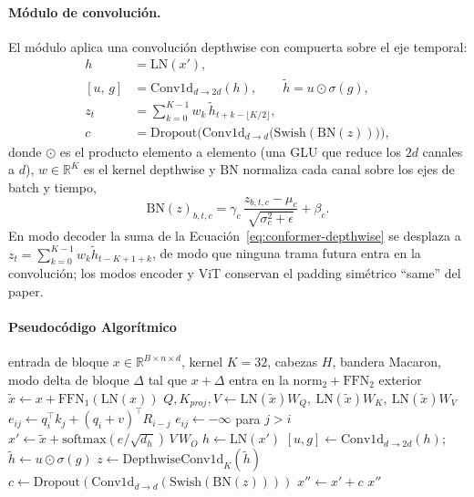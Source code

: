 \paragraph{Módulo de convolución.} El módulo aplica una convolución depthwise con compuerta sobre el eje temporal:
\begin{align}
h &= \mathrm{LN}(x'), \\
[u,\, g] &= \mathrm{Conv1d}_{d \to 2d}(h), \qquad
\tilde{h} = u \odot \sigma(g), \label{eq:conformer-glu}\\
z_t &= \sum_{k=0}^{K-1} w_k\, \tilde{h}_{t + k - \lfloor K/2 \rfloor}, \label{eq:conformer-depthwise}\\
c &= \mathrm{Dropout}\Big(\mathrm{Conv1d}_{d \to d}\big(\mathrm{Swish}(\mathrm{BN}(z))\big)\Big), \label{eq:conformer-conv-out}
\end{align}
donde $\odot$ es el producto elemento a elemento (una GLU que reduce los $2d$ canales a $d$), $w \in \mathbb{R}^{K}$ es el kernel depthwise y $\mathrm{BN}$ normaliza cada canal sobre los ejes de batch y tiempo,
\begin{equation}
\mathrm{BN}(z)_{b,t,c} = \gamma_c\,\frac{z_{b,t,c} - \mu_c}{\sqrt{\sigma_c^2 + \epsilon}} + \beta_c .
\label{eq:conformer-bn}
\end{equation}
En modo decoder la suma de la Ecuación~\ref{eq:conformer-depthwise} se desplaza a $z_t = \sum_{k=0}^{K-1} w_k \tilde{h}_{t-K+1+k}$, de modo que ninguna trama futura entra en la convolución; los modos encoder y ViT conservan el padding simétrico ``same'' del paper.

\paragraph{Pseudocódigo Algorítmico}

\begin{algorithm}[H]
\caption{Bloque Conformer (\texttt{conformer})}
\begin{algorithmic}[1]
\Require entrada de bloque $x \in \mathbb{R}^{B \times n \times d}$, kernel $K=32$, cabezas $H$, bandera Macaron, modo
\Ensure delta de bloque $\Delta$ tal que $x + \Delta$ entra en la $\mathrm{norm}_2 + \mathrm{FFN}_2$ exterior
\State $\tilde{x} \gets x + \mathrm{FFN}_1(\mathrm{LN}(x))$ 
\State $Q, K_{proj}, V \gets \mathrm{LN}(\tilde{x})W_Q,\ \mathrm{LN}(\tilde{x})W_K,\ \mathrm{LN}(\tilde{x})W_V$
\State $e_{ij} \gets q_i^{\top}k_j + (q_i + v)^{\top}R_{i-j}$ 
    \State $e_{ij} \gets -\infty$ para $j > i$ 
\EndIf
\State $x' \gets \tilde{x} + \mathrm{softmax}(e/\sqrt{d_h})\,V\,W_O$
\State $h \gets \mathrm{LN}(x')$
\State $[u, g] \gets \mathrm{Conv1d}_{d \to 2d}(h)$; \quad $\tilde{h} \gets u \odot \sigma(g)$ 
\State $z \gets \mathrm{DepthwiseConv1d}_{K}(\tilde{h})$ 
\State $c \gets \mathrm{Dropout}(\mathrm{Conv1d}_{d \to d}(\mathrm{Swish}(\mathrm{BN}(z))))$
\State $x'' \gets x' + c$
\State \Return $x''$ 
\end{algorithmic}
\end{algorithm}


